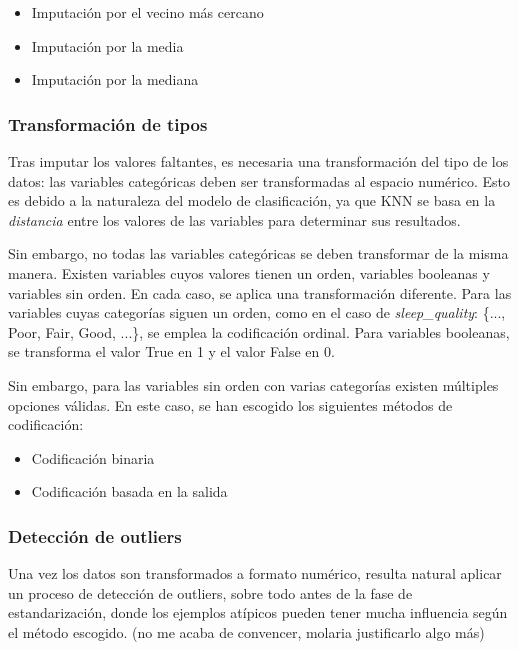 \documentclass{article}
\begin{document}
\begin{itemize}
    \item Imputación por el vecino más cercano
    \item Imputación por la media
    \item Imputación por la mediana
\end{itemize}

\subsubsection{Transformación de tipos}

Tras imputar los valores faltantes, es necesaria una transformación del tipo de los datos: las variables categóricas deben ser transformadas
al espacio numérico. Esto es debido a la naturaleza del modelo de clasificación, ya que KNN se basa en la \textit{distancia}
entre los valores de las variables para determinar sus resultados. \newline

Sin embargo, no todas las variables categóricas se deben transformar de la misma manera. Existen variables cuyos valores tienen un orden,
variables booleanas y variables sin orden. En cada caso, se aplica una transformación diferente. Para las variables cuyas categorías siguen un orden, como en el caso de \textit{sleep\_quality}: \{..., Poor, Fair, Good, ...\}, se emplea la codificación ordinal. Para variables booleanas, se transforma el valor True en 1 y el valor False en 0. \newline

Sin embargo, para las variables sin orden con varias categorías existen múltiples opciones válidas. En este caso, se han
escogido los siguientes métodos de codificación:

\begin{itemize}
    \item Codificación binaria
    \item Codificación basada en la salida
\end{itemize}

\subsubsection{Detección de outliers}

Una vez los datos son transformados a formato numérico, resulta natural aplicar un proceso de detección de outliers, sobre
todo antes de la fase de estandarización, donde los ejemplos atípicos pueden tener mucha influencia según el método escogido. (no me acaba de convencer, molaria justificarlo algo más) \newline
\end{document}

